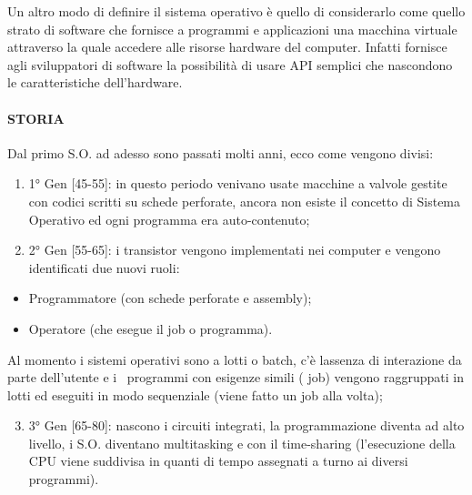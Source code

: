 \documentclass[
]{article}
\providecommand{\tightlist}{%
  \setlength{\itemsep}{0pt}\setlength{\parskip}{0pt}}
\begin{document}
{}

{Un altro modo di definire il sistema operativo è quello di considerarlo
come quello strato di software che fornisce a programmi e applicazioni
una macchina virtuale attraverso la quale accedere alle risorse hardware
del computer. Infatti fornisce agli sviluppatori di software la
possibilità di usare API semplici che nascondono le caratteristiche
dell'hardware.}

{}

\paragraph{\texorpdfstring{{STORIA}}{STORIA}}\label{h.qmhzpkecz7zn}

{Dal primo S.O. ad adesso sono passati molti anni, ecco come vengono
divisi:}

{}

\begin{enumerate}
\tightlist
\item
  {1° Gen {[}45-55{]}}{: in questo periodo venivano usate macchine a
  valvole gestite con codici scritti su schede perforate, ancora non
  esiste il concetto di Sistema Operativo ed ogni programma era
  auto-contenuto;}
\end{enumerate}

{}

\begin{enumerate}
\setcounter{enumi}{1}
\tightlist
\item
  {2° Gen {[}55-65{]}}{: i transistor vengono implementati nei computer
  e vengono identificati due nuovi ruoli:}
\end{enumerate}

\begin{itemize}
\tightlist
\item
  {Programmatore (con schede perforate e assembly);}
\item
  {Operatore (che esegue il job o programma). }
\end{itemize}

{Al momento i sistemi operativi sono a lotti o batch, c'è
l\textquotesingle assenza di interazione da parte dell'utente e i
~programmi con esigenze simili ( job) vengono raggruppati in lotti ed
eseguiti in modo sequenziale (viene fatto un job alla volta);}

{}

\begin{enumerate}
\setcounter{enumi}{2}
\tightlist
\item
  {3° Gen {[}65-80{]}}{: nascono i circuiti integrati, la programmazione
  diventa ad alto livello, i S.O. diventano multitasking e con il
  time-sharing (l'esecuzione della CPU viene suddivisa in quanti di
  tempo assegnati a turno ai diversi programmi). }
\end{enumerate}
\end{document}
